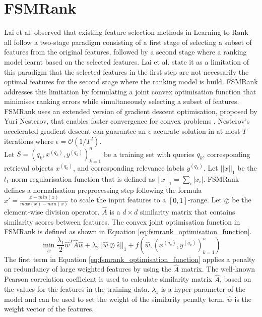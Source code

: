\section{FSMRank}
Lai et al. \cite{Lai2013c} observed that existing feature selection methods in Learning to Rank all follow a two-stage paradigm consisting of a first stage of selecting a subset of features from the original features, followed by a second stage where a ranking model learnt based on the selected features. Lai et al. \cite{Lai2013c} state it as a limitation of this paradigm that the selected features in the first step are not necessarily the optimal features for the second stage where the ranking model is build. FSMRank \cite{Lai2013c} addresses this limitation by formulating a joint convex optimisation function that minimises ranking errors while simultaneously selecting a subset of features.\\

FSMRank uses an extended version of gradient descent optimisation, proposed by Yuri Nesterov, that enables faster convergence for convex problems \cite{Nesterov2004}. Nesterov's accelerated gradient descent can guarantee an $\epsilon$-accurate solution in at most $T$ iterations where $\epsilon=\mathcal{O}(1/T^2)$.\\

Let $S = {(q_k, x^{(q_k)}, y^{(q_k)})}_{k=1}^n$ be a training set with queries $q_k$, corresponding retrieval objects $x^{(q_k)}$, and corresponding relevance labels $y^{(q_k)}$. Let $||x||_1$ be the $l_1$-norm regularisation function that is defined as $||x||_1 = \sum\nolimits_i |x_i|$. FSMRank defines a normalisation preprocessing step following the formula $x' = \frac{x - min(x)}{max(x)-min(x)}$ to scale the input features to a $[0,1]$-range. Let $\oslash$ be the element-wise division operator. $\hat{A}$ is a $d \times d$ similarity matrix that contains similarity scores between features. The convex joint optimisation function in FSMRank is defined as shown in Equation \ref{eq:fsmrank_optimisation_function}.
\begin{equation}
\min_{\hat{w}} \frac{\lambda_1}{2} \hat{w}^T \hat{A}\hat{w} + \lambda_2 ||\hat{w}\oslash\hat{s}||_1 + f(\hat{w}, (x^{(q_k)}, y^{(q_k)})_{k=1}^n)
\label{eq:fsmrank_optimisation_function}
\end{equation}
\noindent The first term in Equation \ref{eq:fsmrank_optimisation_function} applies a penalty on redundancy of large weighted features by using the $\hat{A}$ matrix. The well-known Pearson correlation coefficient is used to calculate similarity matrix $\hat{A}$, based on the values for the features in the training data. $\lambda_1$ is a hyper-parameter of the model and can be used to set the weight of the similarity penalty term. $\hat{w}$ is the weight vector of the features.\\

